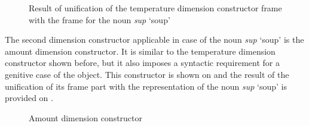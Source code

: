 \begin{figure}
\centering
{}
\caption{Result of unification of the temperature dimension constructor frame with the frame for the noun \textit{sup} `soup'  \label{frame:soup:temp}}
\end{figure}

The second dimension constructor applicable in case of the noun \textit{sup} `soup' is the amount dimension constructor. It is similar to the temperature dimension constructor shown before, but it also imposes a syntactic requirement for a genitive case of the object. This constructor is shown on  and the result of the unification of its frame part with the representation of the noun \textit{sup} `soup' is provided on .

\begin{figure}
\begin{minipage}{0.5\textwidth}\centering
{}
\end{minipage}\begin{minipage}{0.5\textwidth}\centering
\end{minipage}
\caption{Amount dimension constructor \label{constructor:amount}}
\end{figure}

